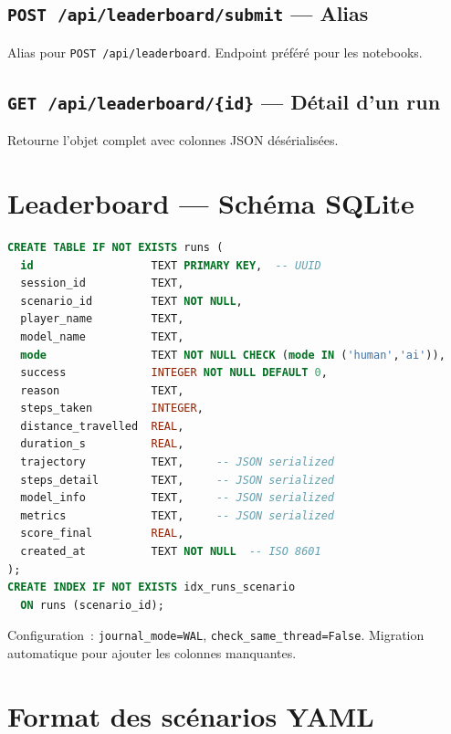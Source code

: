 \documentclass[a4paper, 11pt, french]{article}
\newcommand{\code}[1]{\texttt{#1}}
\newcommand{\apiendpoint}[2]{\texorpdfstring{\texttt{#1}~\texttt{#2}}{#1 #2}}
\begin{document}
\subsection{\apiendpoint{POST}{/api/leaderboard/submit} --- Alias}

Alias pour \code{POST /api/leaderboard}. Endpoint préféré pour les notebooks.

\subsection{\apiendpoint{GET}{/api/leaderboard/\{id\}} --- Détail d'un run}

Retourne l'objet complet avec colonnes JSON désérialisées.

\section{Leaderboard --- Schéma SQLite}
\label{sec:leaderboard}

\begin{lstlisting}[language=SQL, caption={Schéma de la table \code{runs}}]
CREATE TABLE IF NOT EXISTS runs (
  id                  TEXT PRIMARY KEY,  -- UUID
  session_id          TEXT,
  scenario_id         TEXT NOT NULL,
  player_name         TEXT,
  model_name          TEXT,
  mode                TEXT NOT NULL CHECK (mode IN ('human','ai')),
  success             INTEGER NOT NULL DEFAULT 0,
  reason              TEXT,
  steps_taken         INTEGER,
  distance_travelled  REAL,
  duration_s          REAL,
  trajectory          TEXT,     -- JSON serialized
  steps_detail        TEXT,     -- JSON serialized
  model_info          TEXT,     -- JSON serialized
  metrics             TEXT,     -- JSON serialized
  score_final         REAL,
  created_at          TEXT NOT NULL  -- ISO 8601
);
CREATE INDEX IF NOT EXISTS idx_runs_scenario
  ON runs (scenario_id);
\end{lstlisting}

Configuration~: \code{journal\_mode=WAL}, \code{check\_same\_thread=False}.
Migration automatique pour ajouter les colonnes manquantes.

\section{Format des scénarios YAML}
\label{sec:scenarios}
\end{document}

